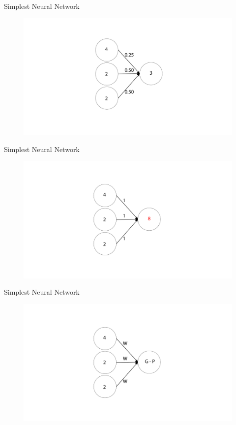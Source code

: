 \documentclass[10pt]{beamer}
\begin{document}
\begin{frame}{Simplest Neural Network}
		\begin{figure}	
			\includegraphics[width=1.5\textwidth, center, trim=0cm 0cm 0 0cm]{images/No_hidden_NN.pdf}
	\end{figure}
\end{frame}

\begin{frame}{Simplest Neural Network}
		\begin{figure}	
			\includegraphics[width=1.5\textwidth, center, trim=0cm 0cm 0 0cm]{images/No_hidden_8W_NN.pdf}
	\end{figure}
\end{frame}

\begin{frame}{Simplest Neural Network}
		\begin{figure}	
			\includegraphics[width=1.5\textwidth, center, trim=0cm 0cm 0 0cm]{images/No_hidden_gen_NN.pdf}
	\end{figure}
\end{frame}
\end{document}
